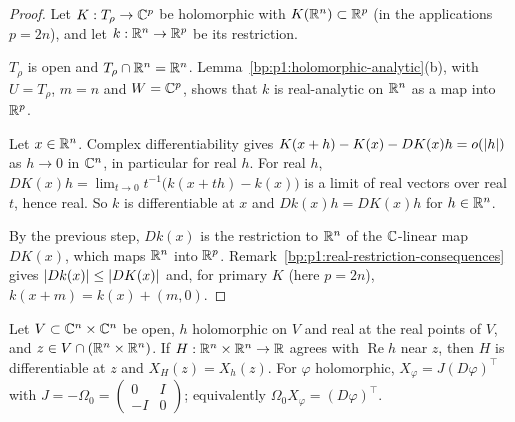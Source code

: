 \begin{proof}
Let $K:T_\rho\to\mathbb{C}^p$ be holomorphic with $K(\mathbb{R}^n)\subset\mathbb{R}^p$ (in the applications $p=2n$), and let
$k:\mathbb{R}^n\to\mathbb{R}^p$ be its restriction.

\label{step:p1:rr-analytic}
$T_\rho$ is open and $T_\rho\cap\mathbb{R}^n=\mathbb{R}^n$. Lemma~\ref{bp:p1:holomorphic-analytic}(b), with $U=T_\rho$,
$m=n$ and $W=\mathbb{C}^p$, shows that $k$ is real-analytic on $\mathbb{R}^n$ as a map into $\mathbb{R}^p$.

\label{step:p1:rr-derivative}
Let $x\in\mathbb{R}^n$. Complex differentiability gives $K(x+h)-K(x)-DK(x)h=o(\lvert h\rvert)$ as $h\to0$ in $\mathbb{C}^n$, in
particular for real $h$. For real $h$, $DK(x)h=\lim_{t\to0}t^{-1}\bigl(k(x+th)-k(x)\bigr)$ is a limit of
real vectors over real $t$, hence real. So $k$ is differentiable at $x$ and $Dk(x)h=DK(x)h$ for
$h\in\mathbb{R}^n$.

\label{step:p1:rr-consequences}
By the previous step, $Dk(x)$ is the restriction to $\mathbb{R}^n$ of the $\mathbb{C}$-linear map $DK(x)$, which maps
$\mathbb{R}^n$ into $\mathbb{R}^p$. Remark~\ref{bp:p1:real-restriction-consequences} gives $\lvert Dk(x)\rvert\le\lvert DK(x)\rvert$
and, for primary $K$ (here $p=2n$), $k(x+m)=k(x)+(m,0)$.
\end{proof}

\begin{lemma}\label{bp:p1:hamiltonian-real}
Let $V\subset\mathbb{C}^n\times\mathbb{C}^n$ be open, $h$ holomorphic on $V$ and real at the real points of $V$, and
$z\in V\cap(\mathbb{R}^n\times\mathbb{R}^n)$. If $H:\mathbb{R}^n\times\mathbb{R}^n\to\mathbb{R}$ agrees with $\operatorname{Re}h$ near $z$, then $H$
is differentiable at $z$ and $X_H(z)=X_h(z)$. For $\varphi$ holomorphic, $X_\varphi=J(D\varphi)^\top$ with
$J=-\Omega_0=\left(\begin{smallmatrix}0&I\\-I&0\end{smallmatrix}\right)$; equivalently
$\Omega_0X_\varphi=(D\varphi)^\top$.
\end{lemma}

